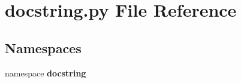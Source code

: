 \section{docstring.py File Reference}
\label{docstring_8py}
\subsection*{Namespaces}
\begin{CompactItemize}
\item 
namespace {\bf docstring}
\end{CompactItemize}
